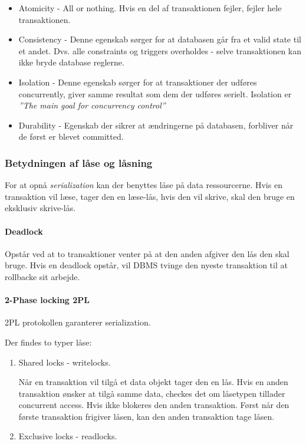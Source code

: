 \begin{itemize}
	\item Atomicity - All or nothing. Hvis en del af transaktionen fejler, fejler hele transaktionen.
	\item Consistency - Denne egenskab sørger for at databasen går fra et valid state til et andet. Dvs. alle constraints og triggers overholdes - selve transaktionen kan ikke bryde database reglerne.
	\item Isolation - Denne egenskab sørger for at transaktioner der udføres concurrently, giver samme resultat som dem der udføres serielt. Isolation er \textit{''The main goal for concurrency control''}
	\item Durability - Egenskab der sikrer at ændringerne på databasen, forbliver når de først er blevet committed.
\end{itemize}
\subsubsection{Betydningen af låse og låsning}

For at opnå \textit{serialization} kan der benyttes låse på data ressourcerne. Hvis en transaktion vil læse, tager den en læse-lås, hvis den vil skrive, skal den bruge en eksklusiv skrive-lås.

\paragraph{Deadlock}
Opstår ved at to transaktioner venter på at den anden afgiver den lås den skal bruge.
Hvis en deadlock opstår, vil DBMS tvinge den nyeste transaktion til at rollbacke sit arbejde.

\paragraph{2-Phase locking 2PL}
2PL protokollen garanterer serialization.

Der findes to typer låse:

\begin{enumerate}
	\item Shared locks - writelocks.
	
	Når en transaktion vil tilgå et data objekt tager den en lås. Hvis en anden transaktion ønsker at tilgå samme data, checkes det om låsetypen tillader concurrent access. Hvis ikke blokeres den anden transaktion. Først når den første transaktion frigiver låsen, kan den anden transaktion tage låsen.
	
	\item Exclusive locks - readlocks.
\end{enumerate}



